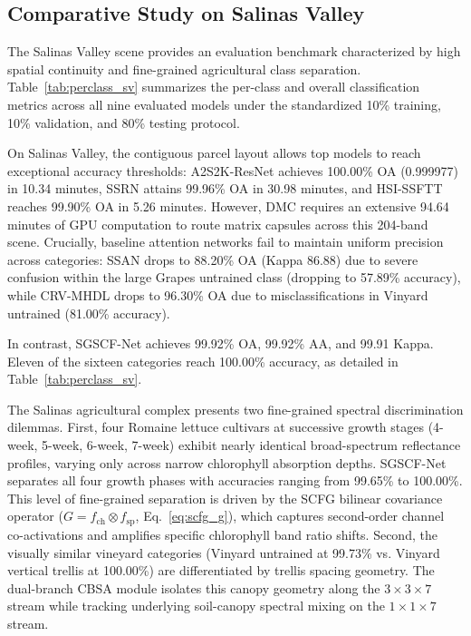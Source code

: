 \documentclass[manuscript,screen,review]{acmart}
\begin{document}
\subsection{Comparative Study on Salinas Valley}
\label{subsec:salinas_study}
The Salinas Valley scene provides an evaluation benchmark characterized by high spatial continuity and fine-grained agricultural class separation. Table~\ref{tab:perclass_sv} summarizes the per-class and overall classification metrics across all nine evaluated models under the standardized 10\% training, 10\% validation, and 80\% testing protocol.

On Salinas Valley, the contiguous parcel layout allows top models to reach exceptional accuracy thresholds: A2S2K-ResNet achieves 100.00\% OA (0.999977) in 10.34 minutes, SSRN attains 99.96\% OA in 30.98 minutes, and HSI-SSFTT reaches 99.90\% OA in 5.26 minutes. However, DMC requires an extensive 94.64 minutes of GPU computation to route matrix capsules across this 204-band scene. Crucially, baseline attention networks fail to maintain uniform precision across categories: SSAN drops to 88.20\% OA (Kappa 86.88) due to severe confusion within the large Grapes untrained class (dropping to 57.89\% accuracy), while CRV-MHDL drops to 96.30\% OA due to misclassifications in Vinyard untrained (81.00\% accuracy).

In contrast, SGSCF-Net achieves 99.92\% OA, 99.92\% AA, and 99.91 Kappa. Eleven of the sixteen categories reach 100.00\% accuracy, as detailed in Table~\ref{tab:perclass_sv}.

The Salinas agricultural complex presents two fine-grained spectral discrimination dilemmas. First, four Romaine lettuce cultivars at successive growth stages (4-week, 5-week, 6-week, 7-week) exhibit nearly identical broad-spectrum reflectance profiles, varying only across narrow chlorophyll absorption depths. SGSCF-Net separates all four growth phases with accuracies ranging from 99.65\% to 100.00\%. This level of fine-grained separation is driven by the SCFG bilinear covariance operator ($G = f_{\text{ch}} \otimes f_{\text{sp}}$, Eq.~\ref{eq:scfg_g}), which captures second-order channel co-activations and amplifies specific chlorophyll band ratio shifts. Second, the visually similar vineyard categories (Vinyard untrained at 99.73\% vs. Vinyard vertical trellis at 100.00\%) are differentiated by trellis spacing geometry. The dual-branch CBSA module isolates this canopy geometry along the $3\times 3\times 7$ stream while tracking underlying soil-canopy spectral mixing on the $1\times 1\times 7$ stream.
\end{document}
